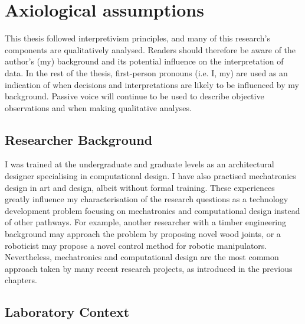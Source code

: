 \section{Axiological assumptions}
\label{section:methodology-axiological-assumptions}

This thesis followed interpretivism principles, and many of this research's components are qualitatively analysed. Readers should therefore be aware of the author’s (my) background and its potential influence on the interpretation of data. In the rest of the thesis, first-person pronouns (i.e. I, my) are used as an indication of when decisions and interpretations are likely to be influenced by my background. Passive voice will continue to be used to describe objective observations and when making qualitative analyses.

\subsection{Researcher Background}
\label{subsection:methodology-researcher-background}

I was trained at the undergraduate and graduate levels as an architectural designer specialising in computational design. I have also practised mechatronics design in art and design, albeit without formal training. These experiences greatly influence my characterisation of the research questions as a technology development problem focusing on mechatronics and computational design instead of other pathways. For example, another researcher with a timber engineering background may approach the problem by proposing novel wood joints, or a roboticist may propose a novel control method for robotic manipulators. Nevertheless, mechatronics and computational design are the most common approach taken by many recent research projects, as introduced in the previous chapters.

\subsection{Laboratory Context}
\label{subsection:methodology-laboratory-context}

